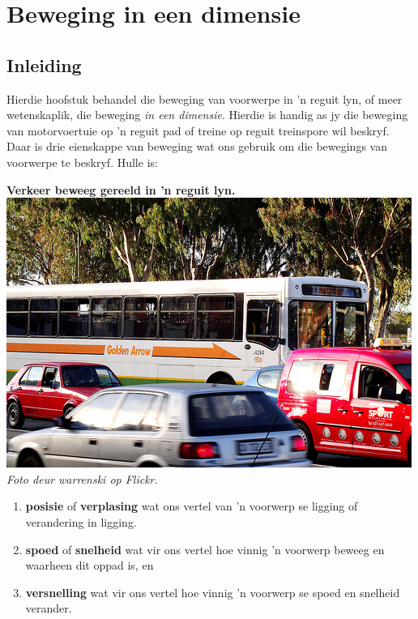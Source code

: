 \chapter{Beweging in een dimensie}
\label{chap:motion}
 
\section{Inleiding}

\begin{minipage}{.5\textwidth}
Hierdie hoofstuk behandel die beweging van voorwerpe in 'n reguit lyn, of meer wetenskaplik, die beweging \textsl{in een dimensie}. Hierdie is handig as jy die beweging van motorvoertuie op 'n reguit pad of treine op reguit treinspore wil beskryf. Daar is drie eienskappe van beweging wat ons gebruik om die bewegings van voorwerpe te beskryf. Hulle is:\par
\end{minipage}
\begin{minipage}{.5\textwidth}
\begin{center}
\textbf{Verkeer beweeg gereeld in 'n reguit lyn.}\\
 \includegraphics[width=.8\textwidth]{photos/trafficby_warrenski_flickr.jpg}\\
\textit{Foto deur warrenski op Flickr.}
\end{center}
\end{minipage}
   
\begin{enumerate}[noitemsep, label=\textbf{\arabic*}. ] 
    \item \textbf{posisie} of \textbf{verplasing} wat ons vertel van 'n voorwerp se ligging of verandering in ligging.
    \item \textbf{spoed} of \textbf{snelheid} wat vir ons vertel hoe vinnig 'n voorwerp beweeg en waarheen dit oppad is, en
    \item \textbf{versnelling} wat vir ons vertel hoe vinnig 'n voorwerp se spoed en snelheid verander. 
\end{enumerate}

